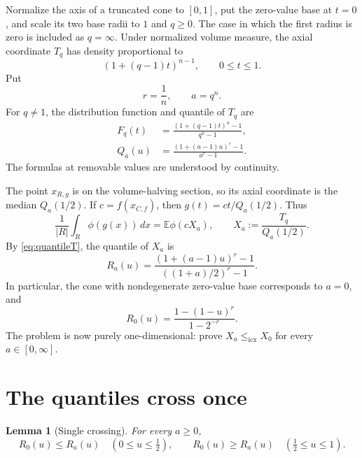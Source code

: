 \documentclass[11pt]{article}
\newtheorem{lemma}[theorem]{Lemma}
\newcommand{\E}{\mathbb E}
\newcommand{\icx}{\mathrm{icx}}
\begin{document}
Normalize the axis of a truncated cone to $[0,1]$, put the zero-value base
at $t=0$, and scale its two base radii to $1$ and $q\ge0$.  The case in
which the first radius is zero is included as $q=\infty$.  Under normalized
volume measure, the axial coordinate $T_q$ has density proportional to
\[
 (1+(q-1)t)^{n-1},\qquad 0\le t\le1.
\]
Put
\[
 r=\frac1n,\qquad a=q^n.
\]
For $q\ne1$, the distribution function and quantile of $T_q$ are
\begin{align}
 F_q(t)
 &=\frac{(1+(q-1)t)^n-1}{q^n-1}, \label{eq:cdf}\\
 Q_a(u)
 &=\frac{(1+(a-1)u)^r-1}{a^r-1}. \label{eq:quantileT}
\end{align}
The formulas at removable values are understood by continuity.

The point $x_{R,g}$ is on the volume-halving section, so its axial
coordinate is the median $Q_a(1/2)$.  If
$c=f(x_{C,f})$, then $g(t)=ct/Q_a(1/2)$.  Thus
\[
 \frac1{|R|}\int_R\phi(g(x))\,dx=\E\phi(cX_a),
 \qquad
 X_a:=\frac{T_q}{Q_a(1/2)}.
\]
By \eqref{eq:quantileT}, the quantile of $X_a$ is
\begin{equation}\label{eq:Ra}
 R_a(u)=
 \frac{(1+(a-1)u)^r-1}{((1+a)/2)^r-1}.
\end{equation}
In particular, the cone with nondegenerate zero-value base corresponds to
$a=0$, and
\begin{equation}\label{eq:R0}
 R_0(u)=\frac{1-(1-u)^r}{1-2^{-r}}.
\end{equation}
The problem is now purely one-dimensional: prove
$X_a\le_{\icx}X_0$ for every $a\in[0,\infty]$.

\section{The quantiles cross once}

\begin{lemma}[Single crossing]\label{lem:cross}
For every $a\ge0$,
\[
 R_0(u)\le R_a(u)\quad(0\le u\le\tfrac12),
 \qquad
 R_0(u)\ge R_a(u)\quad(\tfrac12\le u\le1).
\]
\end{lemma}
\end{document}
